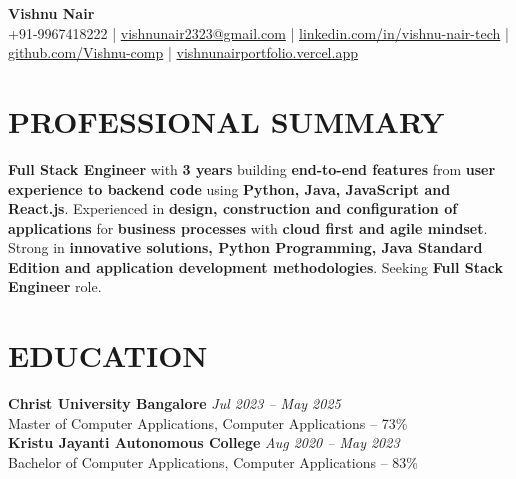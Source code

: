 \documentclass[10pt,a4paper]{article}
\begin{document}

\begin{center}

{\Large \textbf{Vishnu Nair}}\\[4pt]

{\small
+91-9967418222
\quad|\quad
\href{mailto:vishnunair2323@gmail.com}{vishnunair2323@gmail.com}
\quad|\quad
\href{https://linkedin.com/in/vishnu-nair-tech}{linkedin.com/in/vishnu-nair-tech}
\quad|\quad
\href{https://github.com/Vishnu-comp}{github.com/Vishnu-comp}
\quad|\quad
\href{https://vishnunairportfolio.vercel.app}{vishnunairportfolio.vercel.app}
}

\end{center}


\section*{PROFESSIONAL SUMMARY}

\small

\textbf{Full Stack Engineer} with \textbf{3 years} building \textbf{end-to-end features} from \textbf{user experience to backend code} using \textbf{Python, Java, JavaScript and React.js}. Experienced in \textbf{design, construction and configuration of applications} for \textbf{business processes} with \textbf{cloud first and agile mindset}. Strong in \textbf{innovative solutions, Python Programming, Java Standard Edition and application development methodologies}. Seeking \textbf{Full Stack Engineer} role.


\section*{EDUCATION}
\small
\textbf{Christ University Bangalore} \hfill \textit{Jul 2023 -- May 2025}\\
Master of Computer Applications, Computer Applications -- 73\%\\
\small
\textbf{Kristu Jayanti Autonomous College} \hfill \textit{Aug 2020 -- May 2023}\\
Bachelor of Computer Applications, Computer Applications -- 83\%
\end{document}
